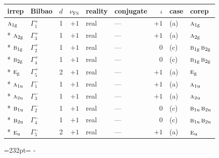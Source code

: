 \documentclass[10pt,a4paper]{article}
\newcommand{\needspace}[1]{\par\penalty-100\begingroup\dimen0=#1\relax\dimen2=\pagegoal
  \advance\dimen2-\pagetotal\ifdim\dimen0>\dimen2\relax\ifdim\dimen2>0pt\vfil\break\fi\fi
  \endgroup}
\numberwithin{equation}{section}
\newcommand{\irr}[1]{\text{\normalfont\scshape #1}}
\newcommand{\ptag}[1]{\mathrm{#1}}
\newcommand{\fsind}{\nu_{\mathrm{FS}}}
\begin{document}
{\small\renewcommand{\arraystretch}{1.25}\setlength{\tabcolsep}{4pt}\begin{longtable}{@{}llrrllrll@{}}\toprule
irrep & Bilbao & $d$ & $\fsind$ & reality & conjugate & $\iota$ & case & corep\\\midrule\endhead
\bottomrule\endfoot\endlastfoot
$\irr{a}_{1\ptag{g}}$ & $\Gamma_{1}^{+}$ & 1 & $+1$ & real & --- & $+1$ & (a) & $\irr{a}_{1\ptag{g}}$\\*
$\irr{a}_{2\ptag{g}}$ & $\Gamma_{3}^{+}$ & 1 & $+1$ & real & --- & $+1$ & (a) & $\irr{a}_{2\ptag{g}}$\\*
$\irr{b}_{1\ptag{g}}$ & $\Gamma_{2}^{+}$ & 1 & $+1$ & real & --- & $0$ & (c) & $\irr{b}_{1\ptag{g}}\,\irr{b}_{2\ptag{g}}$\\*
$\irr{b}_{2\ptag{g}}$ & $\Gamma_{4}^{+}$ & 1 & $+1$ & real & --- & $0$ & (c) & $\irr{b}_{1\ptag{g}}\,\irr{b}_{2\ptag{g}}$\\*
$\irr{e}_{\ptag{g}}$ & $\Gamma_{5}^{+}$ & 2 & $+1$ & real & --- & $+1$ & (a) & $\irr{e}_{\ptag{g}}$\\*
$\irr{a}_{1\ptag{u}}$ & $\Gamma_{1}^{-}$ & 1 & $+1$ & real & --- & $+1$ & (a) & $\irr{a}_{1\ptag{u}}$\\*
$\irr{a}_{2\ptag{u}}$ & $\Gamma_{3}^{-}$ & 1 & $+1$ & real & --- & $+1$ & (a) & $\irr{a}_{2\ptag{u}}$\\*
$\irr{b}_{1\ptag{u}}$ & $\Gamma_{2}^{-}$ & 1 & $+1$ & real & --- & $0$ & (c) & $\irr{b}_{1\ptag{u}}\,\irr{b}_{2\ptag{u}}$\\*
$\irr{b}_{2\ptag{u}}$ & $\Gamma_{4}^{-}$ & 1 & $+1$ & real & --- & $0$ & (c) & $\irr{b}_{1\ptag{u}}\,\irr{b}_{2\ptag{u}}$\\*
$\irr{e}_{\ptag{u}}$ & $\Gamma_{5}^{-}$ & 2 & $+1$ & real & --- & $+1$ & (a) & $\irr{e}_{\ptag{u}}$\\
\bottomrule\end{longtable}}
\needspace{232pt}
\end{document}
